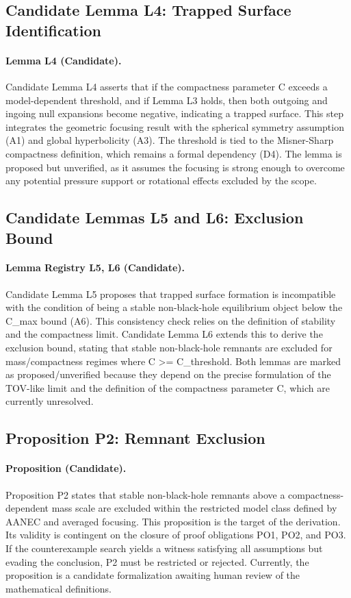 \documentclass[conference]{IEEEtran}
\begin{document}
\subsection{Candidate Lemma L4: Trapped Surface Identification}
\paragraph{Lemma L4 (Candidate).} Candidate Lemma L4 asserts that if the compactness parameter C exceeds a model-dependent threshold, and if Lemma L3 holds, then both outgoing and ingoing null expansions become negative, indicating a trapped surface. This step integrates the geometric focusing result with the spherical symmetry assumption (A1) and global hyperbolicity (A3). The threshold is tied to the Misner-Sharp compactness definition, which remains a formal dependency (D4). The lemma is proposed but unverified, as it assumes the focusing is strong enough to overcome any potential pressure support or rotational effects excluded by the scope.

\subsection{Candidate Lemmas L5 and L6: Exclusion Bound}
\paragraph{Lemma Registry L5, L6 (Candidate).} Candidate Lemma L5 proposes that trapped surface formation is incompatible with the condition of being a stable non-black-hole equilibrium object below the C\_max bound (A6). This consistency check relies on the definition of stability and the compactness limit. Candidate Lemma L6 extends this to derive the exclusion bound, stating that stable non-black-hole remnants are excluded for mass/compactness regimes where C >= C\_threshold. Both lemmas are marked as proposed/unverified because they depend on the precise formulation of the TOV-like limit and the definition of the compactness parameter C, which are currently unresolved.

\subsection{Proposition P2: Remnant Exclusion}
\paragraph{Proposition (Candidate).} Proposition P2 states that stable non-black-hole remnants above a compactness-dependent mass scale are excluded within the restricted model class defined by AANEC and averaged focusing. This proposition is the target of the derivation. Its validity is contingent on the closure of proof obligations PO1, PO2, and PO3. If the counterexample search yields a witness satisfying all assumptions but evading the conclusion, P2 must be restricted or rejected. Currently, the proposition is a candidate formalization awaiting human review of the mathematical definitions.
\end{document}
